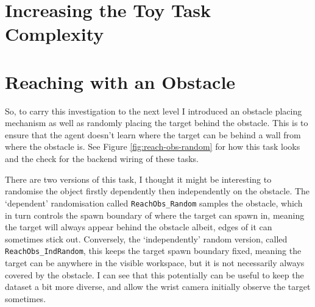 \section{Increasing the Toy Task Complexity}

\section{Reaching with an Obstacle}
So, to carry this investigation to the next level I introduced an obstacle placing mechanism as well as randomly placing the target behind the obstacle. This is to ensure that the agent doesn't learn where the target can be behind a wall from where the obstacle is. See Figure \ref{fig:reach-obs-random} for how this task looks and the check  for the backend wiring of these tasks.

There are two versions of this task, I thought it might be interesting to randomise the object firstly dependently then independently on the obstacle. The `dependent' randomisation called \verb|ReachObs_Random| samples the obstacle, which in turn controls the spawn boundary of where the target can spawn in, meaning the target will always appear behind the obstacle albeit, edges of it can sometimes stick out. Conversely, the `independently' random version, called \verb|ReachObs_IndRandom|, this keeps the target spawn boundary fixed, meaning the target can be anywhere in the visible workspace, but it is not necessarily always covered by the obstacle. I can see that this potentially can be useful to keep the dataset a bit more diverse, and allow the wrist camera initially observe the target sometimes.

